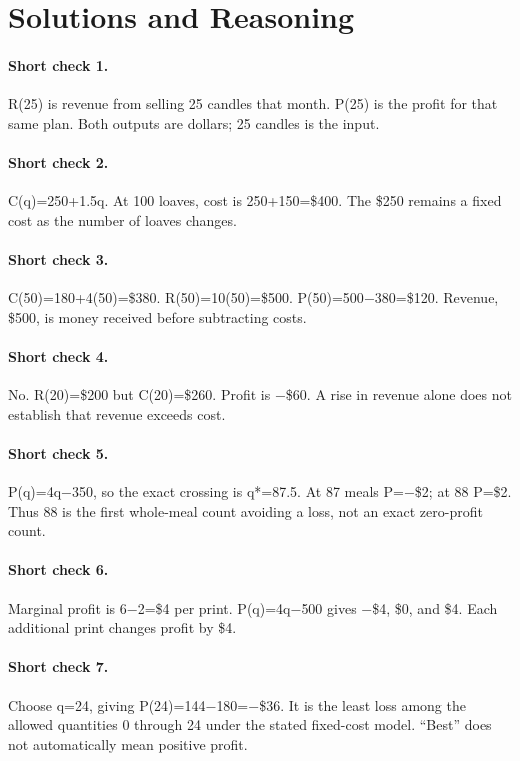 \documentclass[11pt,letterpaper]{article}
\begin{document}
\clearpage
{\setlength{\parskip}{4pt}
\section*{Solutions and Reasoning}

\paragraph{Short check 1.}
R(25) is revenue from selling 25 candles that month. P(25) is the profit for that same plan. Both outputs are dollars; 25 candles is the input.


\paragraph{Short check 2.}
C(q)=250+1.5q. At 100 loaves, cost is 250+150=\$400. The \$250 remains a fixed cost as the number of loaves changes.


\paragraph{Short check 3.}
C(50)=180+4(50)=\$380. R(50)=10(50)=\$500. P(50)=500$-$380=\$120. Revenue, \$500, is money received before subtracting costs.


\paragraph{Short check 4.}
No. R(20)=\$200 but C(20)=\$260. Profit is $-$\$60. A rise in revenue alone does not establish that revenue exceeds cost.


\paragraph{Short check 5.}
P(q)=4q$-$350, so the exact crossing is q*=87.5. At 87 meals P=$-$\$2; at 88 P=\$2. Thus 88 is the first whole-meal count avoiding a loss, not an exact zero-profit count.


\paragraph{Short check 6.}
Marginal profit is 6$-$2=\$4 per print. P(q)=4q$-$500 gives $-$\$4, \$0, and \$4. Each additional print changes profit by \$4.


\paragraph{Short check 7.}
Choose q=24, giving P(24)=144$-$180=$-$\$36. It is the least loss among the allowed quantities 0 through 24 under the stated fixed-cost model. ``Best'' does not automatically mean positive profit.


}
\end{document}
